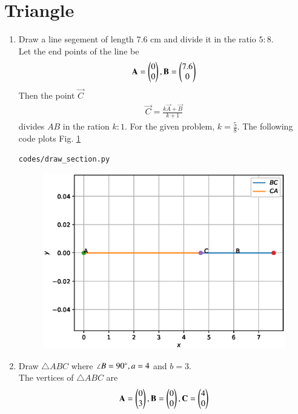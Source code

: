\documentclass[journal,12pt,twocolumn]{IEEEtran}
\renewcommand\thesection{\arabic{section}}
\begin{document}
\section{Triangle}
\begin{enumerate}[label=\thesection.\arabic*
,ref=\thesection.\theenumi]
\item Draw a line segement of length 7.6 cm and divide it in the ratio $5:8$.
\\
\solution Let the end points of the line be 
\begin{align}
\mathbf{A} = \begin{pmatrix}0\\0\end{pmatrix}, \mathbf{B} = \begin{pmatrix}7.6\\0\end{pmatrix}
\end{align}
Then the point $\vec{C}$
\begin{align}
\vec{C} = \frac{k \vec{A} + \vec{B}}{k+1}
\end{align}
divides $AB$ in the ration $k:1$. For the given problem, $k = \frac{5}{8}$.
The following code plots Fig. \ref{fig:section}
\begin{lstlisting}
codes/draw_section.py
\end{lstlisting}
\begin{figure}[!ht]
\includegraphics[width=\columnwidth]{./figs/section.eps}
\caption{}
\label{fig:section}
\end{figure}
\item Draw $\triangle ABC$ where $\angle B = 90\degree, a = 4$ and $b = 3$.
\\
\solution The vertices of $\triangle ABC$ are 
\begin{align}
\vec{A} = \myvec{0\\3}, \vec{B} = \myvec{0\\0}, \vec{C} = \myvec{4\\0}

\end{align}
\end{enumerate}
\end{document}
